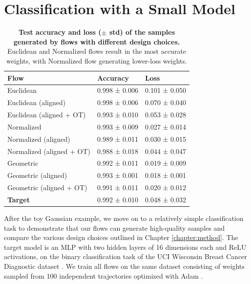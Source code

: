 \section{Classification with a Small Model} \label{sec:uci_classification}

\begin{table}[t!]
    \centering
    \begin{tabular}{lll}
        \toprule
        \textbf{Flow}  & \textbf{Accuracy} & \textbf{Loss} \\
        \midrule
        Euclidean                   & 0.998 ± 0.006     & 0.101 ± 0.050 \\ 
        Euclidean (aligned)         & 0.998 ± 0.006     & 0.070 ± 0.040 \\
        Euclidean (aligned + OT)    & 0.993 ± 0.010     & 0.053 ± 0.028 \\
        \midrule
        Normalized                  & 0.993 ± 0.009     & 0.027 ± 0.014 \\
        Normalized (aligned)        & 0.989 ± 0.011     & 0.030 ± 0.015 \\
        Normalized (aligned + OT)   & 0.988 ± 0.018	    & 0.044 ± 0.047 \\
        \midrule
        Geometric                   & 0.992 ± 0.011     & 0.019 ± 0.009 \\
        Geometric (aligned)         & 0.993 ± 0.001     & 0.018 ± 0.001 \\
        Geometric (aligned + OT)    & 0.991 ± 0.011 	& 0.020 ± 0.012 \\
        \midrule
        \textbf{Target}             & 0.992 ± 0.010     & 0.048 ± 0.032 \\
        \bottomrule
    \end{tabular}
    \caption{\label{tab:uci_class_table}\textbf{Test accuracy and loss ($\pm$ std) of the samples generated by flows with different design choices.} Euclidean and Normalized flows result in the most accurate weights, with Normalized flow generating lower-loss weights.}
\end{table}

After the toy Gaussian example, we move on to a relatively simple classification task to demonstrate that our flows can generate high-quality samples and compare the various design choices outlined in Chapter \ref{chapter:method}. The target model is an MLP with two hidden layers of 16 dimensions each and ReLU activations, on the binary classification task of the UCI Wisconsin Breast Cancer Diagnostic dataset \citep{streetNuclearFeatureExtraction1993}. We train all flows on the same dataset consisting of weights sampled from 100 independent trajectories optimized with Adam \citep{kingmaAdamMethodStochastic2017}. 

